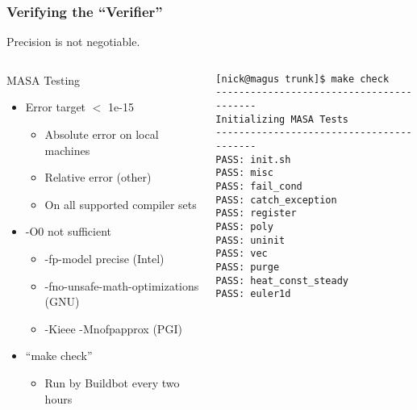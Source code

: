 \documentclass[mathserif]{beamer}
\begin{document}
\begin{frame}[fragile]
  \frametitle{Verifying the ``Verifier''}  
  Precision is not negotiable.
  \begin{columns}[c]
    \begin{column}{7cm}



      \begin{block}{\small MASA Testing}
        \begin{itemize}
        \item \small Error target $<$ 1e-15
          \begin{itemize}
            \small
            \item Absolute error on local machines
            \item Relative error (other)
            \item On all supported compiler sets
          \end{itemize}
        \item \small -O0 not sufficient
          \begin{itemize}
            \small
            \item -fp-model precise (Intel)
            \item -fno-unsafe-math-optimizations (GNU)
            \item -Kieee -Mnofpapprox (PGI)
          \end{itemize}
        \item \small ``make check''
          \begin{itemize}
          \item \small Run by Buildbot every two hours
          \end{itemize}
          \normalsize
        \end{itemize}        
      \end{block}
    \end{column}
    \begin{column}{4.2cm}
      {\tiny
\begin{verbatim}
[nick@magus trunk]$ make check
-----------------------------------------
Initializing MASA Tests
-----------------------------------------
PASS: init.sh
PASS: misc
PASS: fail_cond
PASS: catch_exception
PASS: register
PASS: poly
PASS: uninit
PASS: vec
PASS: purge
PASS: heat_const_steady
PASS: euler1d


\end{verbatim}}
\end{column}
\end{columns}
\end{frame}
\end{document}
